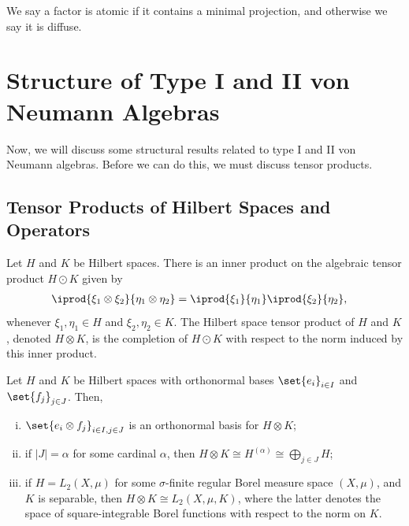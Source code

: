 \documentclass[10pt]{mypackage}
\begin{document}
\begin{definition}
  We say a factor is atomic if it contains a minimal projection, and otherwise we say it is diffuse.
\end{definition}
\section{Structure of Type I and II von Neumann Algebras}%
Now, we will discuss some structural results related to type I and II von Neumann algebras. Before we can do this, we must discuss tensor products.
\subsection{Tensor Products of Hilbert Spaces and Operators}%
\begin{definition}
  Let $H$ and $K$ be Hilbert spaces. There is an inner product on the algebraic tensor product $H\odot K$ given by
  \begin{align*}
    \iprod{\xi_1\otimes \xi_2}{\eta_1\otimes \eta_2} &= \iprod{\xi_1}{\eta_1} \iprod{\xi_2}{\eta_2},
  \end{align*}
  whenever $\xi_1,\eta_1\in H$ and $\xi_2,\eta_2\in K$. The Hilbert space tensor product of $H$ and $K$, denoted $H\otimes K$, is the completion of $H\odot K$ with respect to the norm induced by this inner product.
\end{definition}
\begin{proposition}
  Let $H$ and $K$ be Hilbert spaces with orthonormal bases $\set{e_i}_{i\in I}$ and $\set{f_j}_{j\in J}$. Then,
  \begin{enumerate}[(i)]
    \item $\set{e_i\otimes f_j}_{i\in I,j\in J}$ is an orthonormal basis for $H\otimes K$;
    \item if $\left\vert J \right\vert = \alpha$ for some cardinal $\alpha$, then $H\otimes K\cong H^{(\alpha)}\cong \bigoplus_{j\in J}H$;
    \item if $H = L_2\left( X,\mu \right)$ for some $\sigma$-finite regular Borel measure space $\left( X,\mu \right)$, and $K$ is separable, then $H\otimes K \cong L_2\left( X,\mu,K \right)$, where the latter denotes the space of square-integrable Borel functions with respect to the norm on $K$.
  \end{enumerate}
\end{proposition}
\end{document}

